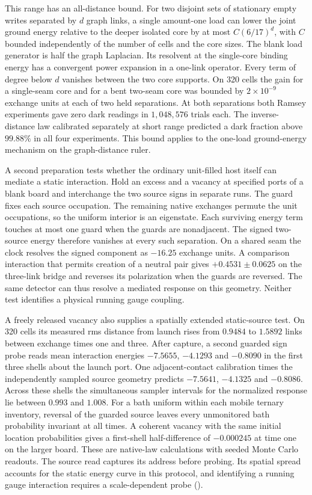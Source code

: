 \documentclass[11pt]{article}
\theoremstyle{definition}
\theoremstyle{remark}
\theoremstyle{plain}
\begin{document}
This range has an all-distance bound. For two disjoint sets of
stationary empty writes separated by $d$ graph links, a single
amount-one load can lower the joint ground energy relative to the
deeper isolated core by at most $C(6/17)^d$, with $C$ bounded
independently of the number of cells and the core sizes. The blank
load generator is half the graph Laplacian. Its resolvent at the
single-core binding energy has a convergent power expansion in a
one-link operator. Every term of degree below $d$ vanishes between
the two core supports. On 320 cells the gain for a single-seam core
and for a bent two-seam core was bounded by $2\times10^{-9}$ exchange
units at each of two held separations. At both separations both
Ramsey experiments gave zero dark readings in $1{,}048{,}576$ trials
each. The inverse-distance law calibrated separately at short range
predicted a dark fraction above $99.88\%$ in all four experiments.
This bound applies to the one-load ground-energy mechanism on the
graph-distance ruler.

A second preparation tests whether the ordinary unit-filled host itself
can mediate a static interaction. Hold an excess and a vacancy at
specified ports of a blank board and interchange the two source signs in
separate runs. The guard fixes each source occupation. The remaining
native exchanges permute the unit occupations, so the uniform interior is
an eigenstate. Each surviving energy term touches at most one guard
when the guards are nonadjacent. The signed two-source energy therefore
vanishes at every such separation. On a shared seam the clock resolves
the signed component as $-16.25$ exchange units. A comparison interaction
that permits creation of a neutral pair gives $+0.4531\pm0.0625$ on
the three-link bridge and reverses its polarization when the guards are
reversed. The same detector can thus resolve a mediated response on this
geometry. Neither test identifies a physical running gauge coupling.

A freely released vacancy also supplies a spatially extended static-source
test. On 320 cells its measured rms distance from launch rises from
$0.9484$ to $1.5892$ links between exchange times one and three.
After capture, a second guarded sign probe reads mean interaction
energies $-7.5655$, $-4.1293$ and $-0.8090$ in the first three shells
about the launch port. One adjacent-contact calibration times the
independently sampled source geometry predicts $-7.5641$, $-4.1325$
and $-0.8086$. Across these shells the simultaneous sampler intervals
for the normalized response lie between $0.993$ and $1.008$. For a bath
uniform within each mobile ternary inventory, reversal of the guarded
source leaves every unmonitored bath probability invariant at all times.
A coherent vacancy with the same initial location probabilities gives a
first-shell half-difference of $-0.000245$ at time one on the larger
board. These are native-law calculations with seeded Monte Carlo
readouts. The source read captures its address before probing. Its
spatial spread accounts for the static energy curve in this protocol,
and identifying a running gauge interaction requires a scale-dependent probe
().
\end{document}
